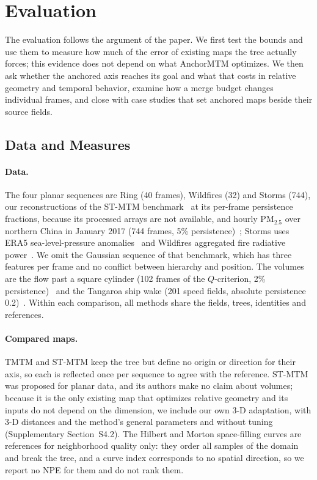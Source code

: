 


\section{Evaluation}\label{sec:experiments}
The evaluation follows the argument of the paper. We first test the bounds and use them to measure how much of the error of existing maps the tree actually forces; this evidence does not depend on what AnchorMTM optimizes. We then ask whether the anchored axis reaches its goal and what that costs in relative geometry and temporal behavior, examine how a merge budget changes individual frames, and close with case studies that set anchored maps beside their source fields.

\subsection{Data and Measures}
\paragraph{Data.} The four planar sequences are Ring (40 frames), Wildfires (32) and Storms (744), our reconstructions of the ST-MTM benchmark~\cite{STMTM:2026} at its per-frame persistence fractions, because its processed arrays are not available, and hourly PM$_{2.5}$ over northern China in January 2017 (744 frames, 5\% persistence)~\cite{Kong:2021:CAQRA}; Storms uses ERA5 sea-level-pressure anomalies~\cite{Hersbach:2020:ERA5} and Wildfires aggregated fire radiative power~\cite{Franke:2021:1DP}. We omit the Gaussian sequence of that benchmark, which has three features per frame and no conflict between hierarchy and position. The volumes are the flow past a square cylinder (102 frames of the $Q$-criterion, 2\% persistence)~\cite{Camarri:2005:Cylinder,Weinkauf:SquareCylinder} and the Tangaroa ship wake (201 speed fields, absolute persistence 0.2)~\cite{Popinet:2004:Tangaroa}. Within each comparison, all methods share the fields, trees, identities and references.

\paragraph{Compared maps.} TMTM and ST-MTM keep the tree but define no origin or direction for their axis, so each is reflected once per sequence to agree with the reference. ST-MTM was proposed for planar data, and its authors make no claim about volumes; because it is the only existing map that optimizes relative geometry and its inputs do not depend on the dimension, we include our own 3-D adaptation, with 3-D distances and the method's general parameters and without tuning (Supplementary Section~S4.2). The Hilbert and Morton space-filling curves are references for neighborhood quality only: they order all samples of the domain and break the tree, and a curve index corresponds to no spatial direction, so we report no NPE for them and do not rank them.

